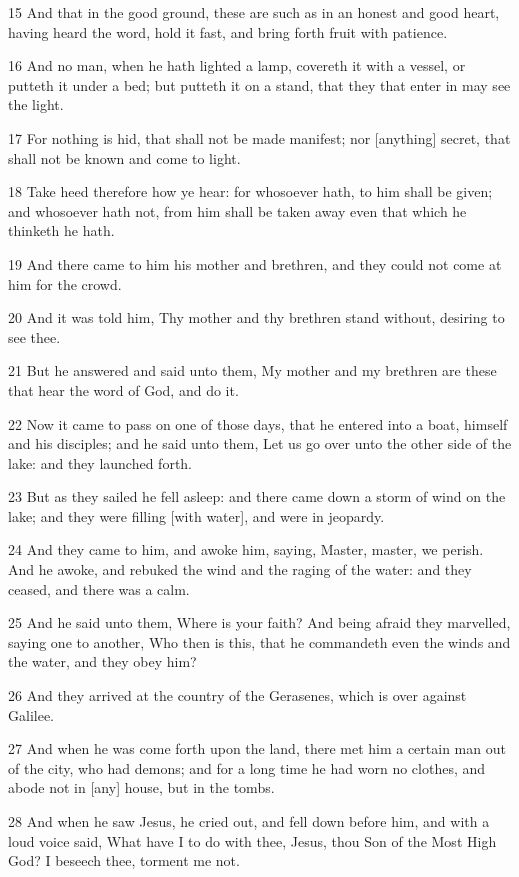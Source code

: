 \par 15 And that in the good ground, these are such as in an honest and good heart, having heard the word, hold it fast, and bring forth fruit with patience.
\par 16 And no man, when he hath lighted a lamp, covereth it with a vessel, or putteth it under a bed; but putteth it on a stand, that they that enter in may see the light.
\par 17 For nothing is hid, that shall not be made manifest; nor [anything] secret, that shall not be known and come to light.
\par 18 Take heed therefore how ye hear: for whosoever hath, to him shall be given; and whosoever hath not, from him shall be taken away even that which he thinketh he hath.
\par 19 And there came to him his mother and brethren, and they could not come at him for the crowd.
\par 20 And it was told him, Thy mother and thy brethren stand without, desiring to see thee.
\par 21 But he answered and said unto them, My mother and my brethren are these that hear the word of God, and do it.
\par 22 Now it came to pass on one of those days, that he entered into a boat, himself and his disciples; and he said unto them, Let us go over unto the other side of the lake: and they launched forth.
\par 23 But as they sailed he fell asleep: and there came down a storm of wind on the lake; and they were filling [with water], and were in jeopardy.
\par 24 And they came to him, and awoke him, saying, Master, master, we perish. And he awoke, and rebuked the wind and the raging of the water: and they ceased, and there was a calm.
\par 25 And he said unto them, Where is your faith? And being afraid they marvelled, saying one to another, Who then is this, that he commandeth even the winds and the water, and they obey him?
\par 26 And they arrived at the country of the Gerasenes, which is over against Galilee.
\par 27 And when he was come forth upon the land, there met him a certain man out of the city, who had demons; and for a long time he had worn no clothes, and abode not in [any] house, but in the tombs.
\par 28 And when he saw Jesus, he cried out, and fell down before him, and with a loud voice said, What have I to do with thee, Jesus, thou Son of the Most High God? I beseech thee, torment me not.
